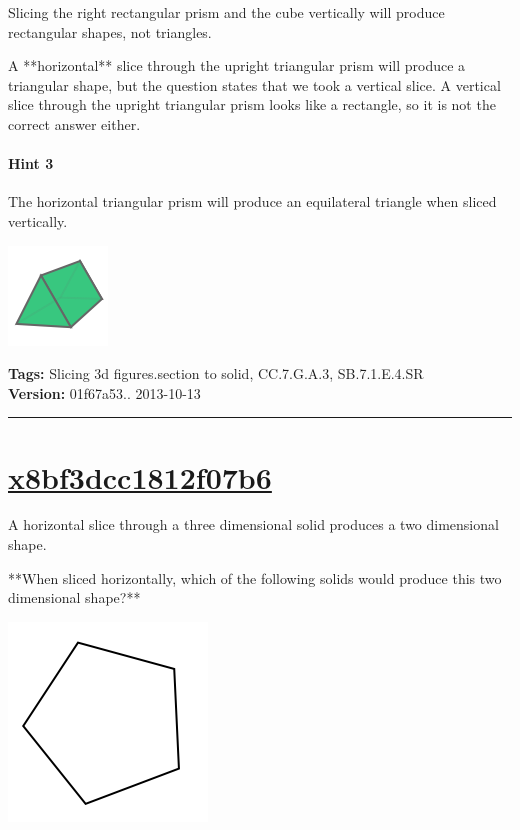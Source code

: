 \documentclass[twocolumn,10pt]{article}
\def\shrinkfactor{0.4}
\begin{document}
Slicing the right rectangular prism and the cube vertically will produce rectangular shapes, not triangles.

A **horizontal** slice through the upright triangular prism will produce a triangular shape, but the question states that we took a vertical slice.
A vertical slice through the upright triangular prism looks like a rectangle, so it is not the correct answer either.

\paragraph{Hint 3}The horizontal triangular prism will produce an equilateral triangle when sliced vertically.  

\includegraphics[scale=\shrinkfactor]{figures/14c5d54ad8e900843fbf2ef335f5a5a14d651f5b.png}



\medskip
\noindent
\textbf{Tags:} {\footnotesize Slicing 3d figures.section to solid, CC.7.G.A.3, SB.7.1.E.4.SR}\\
\textbf{Version:} 01f67a53.. 2013-10-13
\smallskip\hrule





\section{\href{https://www.khanacademy.org/devadmin/content/items/x8bf3dcc1812f07b6}{x8bf3dcc1812f07b6}}

\noindent
A horizontal slice through a three dimensional solid produces a two dimensional shape.

**When sliced horizontally, which of the following solids would produce this two dimensional shape?**   

\includegraphics[scale=\shrinkfactor]{figures/f6f3d7d862af181c9db9337ad959b4868e25835c.png} 
\end{document}
